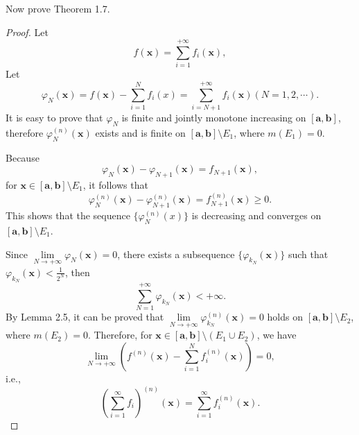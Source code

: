 \documentclass{ijclclp}
\begin{document}
Now prove Theorem 1.7.
\begin{proof}
    Let
    \[f(\boldsymbol{x})=\sum_{i=1}^{+\infty}f_{i}(\boldsymbol{x}),\]
    Let
    \[\varphi_{N}(\boldsymbol{x}) = f(\boldsymbol{x})-\sum_{i=1}^{N}f_{i}(x)=\sum_{i=N+1}^{+\infty}f_{i}(\boldsymbol{x})(N=1,2,\cdots).\]
    It is easy to prove that \(\varphi_N\) is finite and jointly monotone increasing on \([\boldsymbol{a},\boldsymbol{b}]\), therefore \(\varphi_N^{(n)}(\boldsymbol{x})\) exists and is finite on \([\boldsymbol{a},\boldsymbol{b}]\setminus E_1\), where \(m(E_1)=0\).
    
    Because
    \[\varphi_{N}(\boldsymbol{x})-\varphi_{N+1}(\boldsymbol{x})=f_{N+1}(\boldsymbol{x}),\]
    for \(\boldsymbol{x}\in[\boldsymbol{a},\boldsymbol{b}]\setminus E_1\), it follows that
    \[\varphi_{N}^{(n)}(\boldsymbol{x})-\varphi_{N+1}^{(n)}(\boldsymbol{x})=f_{N+1}^{(n)}(\boldsymbol{x})\geq 0.\]
    This shows that the sequence \(\{\varphi_{N}^{(n)}(x)\}\) is decreasing and converges on \([\boldsymbol{a},\boldsymbol{b}]\setminus E_1\).
    
    Since \(\lim\limits_{N\to+\infty}\varphi_{N}(\boldsymbol{x})=0\), there exists a subsequence \(\{\varphi_{k_{N}}(\boldsymbol{x})\}\) such that \(\varphi_{k_{N}}(\boldsymbol{x})<\frac{1}{2^{N}}\), then
    \[\sum_{N=1}^{+\infty}\varphi_{k_{N}}(\boldsymbol{x})<+\infty.\]
    By Lemma 2.5, it can be proved that \(\lim\limits_{N\to +\infty}\varphi_{k_{N}}^{(n)}(\boldsymbol{x})=0\) holds on \([\boldsymbol{a},\boldsymbol{b}]\setminus E_2\), where \(m(E_2)=0\). Therefore, for \(\boldsymbol{x}\in[\boldsymbol{a},\boldsymbol{b}]\setminus (E_1\cup E_2)\), we have
    \[\lim_{N\to+\infty}\left(f^{(n)}(\boldsymbol{x})-\sum_{i=1}^{N}f_{i}^{(n)}(\boldsymbol{x})\right)=0,\]
    i.e.,
    \[\left(\sum_{i=1}^{\infty} f_{i}\right)^{(n)}(\boldsymbol{x})= \sum_{i=1}^{\infty} f_{i}^{(n)}(\boldsymbol{x}).\]
\end{proof}

\end{document}
